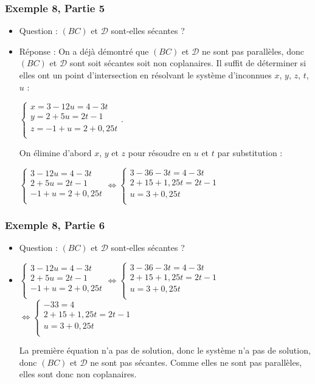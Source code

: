 \documentclass[xcolor=svgnames,t,final]{beamer}
\newcommand{\Sys}[3]{
\left\lbrace
 \begin{array}{l}
  #1\\
  #2\\
  #3\\
 \end{array}
\right.}
\begin{document}
\begin{frame}


\frametitle{Exemple 8, Partie 5}

\begin{itemize}
 \item {\color{blue} Question : $(BC)$  et $\mathcal{D}$ sont-elles sécantes ? 
}
\pause \item {\color{red} Réponse :  On a déjà démontré que  $(BC)$  et $\mathcal{D}$ ne sont pas parallèles, donc  $(BC)$  et $\mathcal{D}$ sont soit sécantes soit non coplanaires. Il suffit de déterminer si elles ont un point d'intersection en résolvant le système d'inconnues $x$, $y$, $z$, $t$, $u$ :

$\Sys{x=3-12u=4-3t}{y=2 + 5u=2t-1}{z=-1+u=2+0,25t}$.
 
On élimine d'abord $x$, $y$ et $z$ pour résoudre en $u$ et $t$ par substitution :

$\Sys{3-12u=4-3t}{2 + 5u=2t-1}{-1+u=2+0,25t}\Leftrightarrow \Sys{3-36-3t=4-3t}{2+15+1,25t=2t-1}{u=3+0,25t}$ 

}

\end{itemize}



\end{frame}



\begin{frame}


\frametitle{Exemple 8, Partie 6}

\begin{itemize}
 \item {\color{blue} Question : $(BC)$  et $\mathcal{D}$ sont-elles sécantes ? 
}
\pause \item {\color{red} $\Sys{3-12u=4-3t}{2 + 5u=2t-1}{-1+u=2+0,25t}\Leftrightarrow \Sys{3-36-3t=4-3t}{2+15+1,25t=2t-1}{u=3+0,25t}$ 
$\Leftrightarrow \Sys{-33=4}{2+15+1,25t=2t-1}{u=3+0,25t}$


La première équation n'a pas de solution, donc le système n'a pas de solution, donc $(BC)$  et $\mathcal{D}$ ne sont pas sécantes. Comme elles ne sont pas parallèles, elles sont donc non coplanaires.

}

\end{itemize}



\end{frame}
\end{document}
